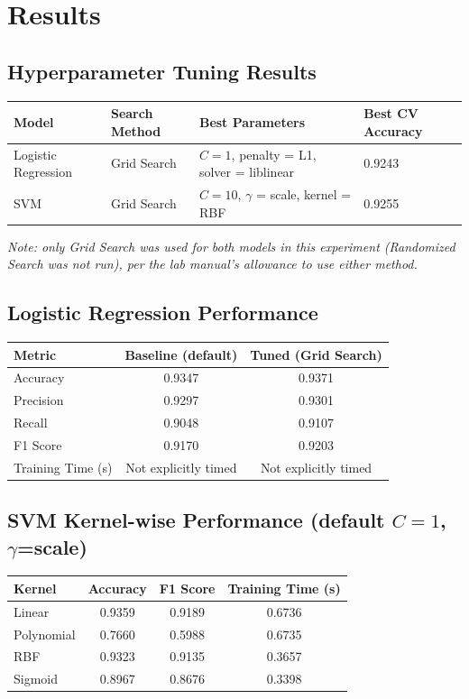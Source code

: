 \documentclass[12pt,a4paper]{article}
\begin{document}
\section{Results}

\subsection*{Hyperparameter Tuning Results}
\begin{longtable}{p{3cm}p{3cm}p{5cm}p{2.5cm}}
\toprule
Model & Search Method & Best Parameters & Best CV Accuracy \\
\midrule
Logistic Regression & Grid Search & $C=1$, penalty = L1, solver = liblinear & 0.9243 \\
SVM & Grid Search & $C=10$, $\gamma$ = scale, kernel = RBF & 0.9255 \\
\bottomrule
\end{longtable}
\textit{Note: only Grid Search was used for both models in this experiment (Randomized Search was
not run), per the lab manual's allowance to use either method.}

\subsection*{Logistic Regression Performance}
\begin{tabular}{lcc}
\toprule
Metric & Baseline (default) & Tuned (Grid Search) \\
\midrule
Accuracy & 0.9347 & 0.9371 \\
Precision & 0.9297 & 0.9301 \\
Recall & 0.9048 & 0.9107 \\
F1 Score & 0.9170 & 0.9203 \\
Training Time (s) & Not explicitly timed & Not explicitly timed \\
\bottomrule
\end{tabular}

\subsection*{SVM Kernel-wise Performance (default $C=1$, $\gamma$=scale)}
\begin{longtable}{lccc}
\toprule
Kernel & Accuracy & F1 Score & Training Time (s) \\
\midrule
Linear & 0.9359 & 0.9189 & 0.6736 \\
Polynomial & 0.7660 & 0.5988 & 0.6735 \\
RBF & 0.9323 & 0.9135 & 0.3657 \\
Sigmoid & 0.8967 & 0.8676 & 0.3398 \\
\bottomrule
\end{longtable}
\end{document}
